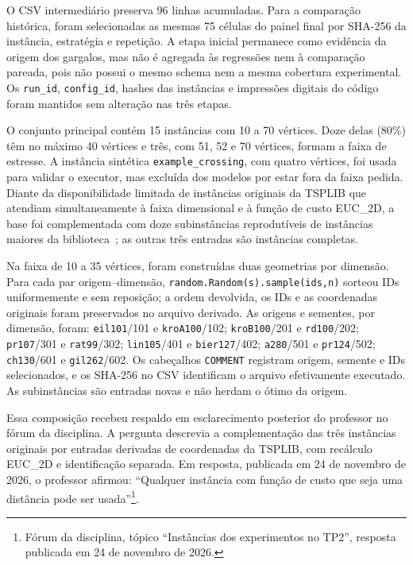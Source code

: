 \documentclass[12pt]{article}
\begin{document}
O CSV intermediário preserva 96 linhas acumuladas. Para a comparação histórica,
foram selecionadas as mesmas 75 células do painel final por SHA-256 da
instância, estratégia e repetição. A etapa inicial permanece como evidência da
origem dos gargalos, mas não é agregada às regressões nem à comparação pareada,
pois não possui o mesmo schema nem a mesma cobertura experimental. Os
\texttt{run\_id}, \texttt{config\_id}, hashes das instâncias e impressões
digitais do código foram mantidos sem alteração nas três etapas.

O conjunto principal contém 15 instâncias com 10 a 70 vértices. Doze delas
(80\%) têm no máximo 40 vértices e três, com 51, 52 e 70 vértices, formam a
faixa de estresse. A instância sintética \texttt{example\_crossing}, com quatro
vértices, foi usada para validar o executor, mas excluída dos modelos por estar
fora da faixa pedida. Diante da disponibilidade limitada de instâncias originais
da TSPLIB que atendiam simultaneamente à faixa dimensional e à função de custo
EUC\_2D, a base foi complementada com doze subinstâncias reprodutíveis de
instâncias maiores da biblioteca~\cite{reinelt1991}; as outras três entradas são
instâncias completas.

Na faixa de 10 a 35 vértices, foram construídas duas geometrias por dimensão.
Para cada par origem--dimensão, \texttt{random.Random(s).sample(ids,n)} sorteou
IDs uniformemente e sem reposição; a ordem devolvida, os IDs e as coordenadas
originais foram preservados no arquivo derivado. As origens e sementes, por
dimensão, foram: \texttt{eil101}/101 e \texttt{kroA100}/102; \texttt{kroB100}/201
e \texttt{rd100}/202; \texttt{pr107}/301 e \texttt{rat99}/302;
\texttt{lin105}/401 e \texttt{bier127}/402; \texttt{a280}/501 e
\texttt{pr124}/502; \texttt{ch130}/601 e \texttt{gil262}/602. Os cabeçalhos
\texttt{COMMENT} registram origem, semente e IDs selecionados, e os SHA-256 no
CSV identificam o arquivo efetivamente executado. As subinstâncias são entradas
novas e não herdam o ótimo da origem.

Essa composição recebeu respaldo em esclarecimento posterior do professor no
fórum da disciplina. A pergunta descrevia a complementação das três instâncias
originais por entradas derivadas de coordenadas da TSPLIB, com recálculo
EUC\_2D e identificação separada. Em resposta, publicada em 24 de novembro de
2026, o professor afirmou: ``Qualquer instância com função de custo que seja uma
distância pode ser usada''\footnote{Fórum da disciplina, tópico ``Instâncias dos
experimentos no TP2'', resposta publicada em 24 de novembro de 2026.}.
\end{document}
